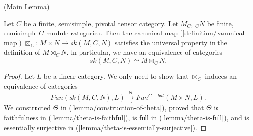 \begin{lemma} (Main Lemma) \label{lemma/main-lemma}

  \noindent Let $C$ be a finite, semisimple, pivotal tensor category. Let
  $M_{C}, \, {}_{C}N$ be finite, semisimple $C$-module categories. Then the
  canonical map (\ref{definition/canonical-map}) $\boxtimes_{C}$:
  $M \times N \to sk(M,C,N)$ satisfies the universal property in the
  definition of $M \boxtimes_{C} N$. In particular, we have an equivalence of
  categories
  \[
    sk(M,C,N) \simeq M \boxtimes_{C} N.
  \]
\end{lemma}

\begin{proof}
  Let $L$ be a linear category. We only need to show that $\boxtimes_{C}$
  induces an equivalence of categories
  \[
    Fun(sk(M,C,N), L) \xrightarrow[\sim]{\Theta} Fun^{C-bal}(M \times N, L).
  \]
  We constructed $\Theta$ in (\ref{lemma/construction-of-theta}), proved that
  $\Theta$ is faithfulness in (\ref{lemma/theta-is-faithful}), is full in
  (\ref{lemma/theta-is-full}), and is essentially surjective in
  (\ref{lemma/theta-is-essentially-surjective}).
\end{proof}


